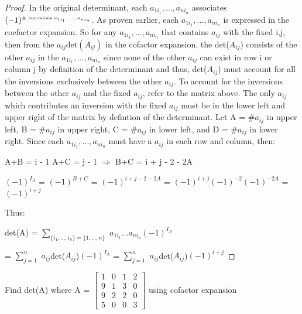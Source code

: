 \begin{proof}
        In the original determinant, each $a_{1i_1},...,a_{ni_n}$ associates
        $(-1)^{\text{\tiny \# inversions $a_{1i_1},...,a_{ni_n}$}}$.
        As proven earlier, each $a_{1i_1},...,a_{ni_n}$ is expressed
        in the coefactor expansion.
        So for any $a_{1i_1},...,a_{ni_n}$ that contains $a_{ij}$ with the
        fixed i,j, then from the $a_{ij}\text{det}(A_{ij})$ in the
        cofactor expansion, the det($A_{ij}$)
        consists of the other $a_{ij}$ in the $a_{1i_1},...,a_{ni_n}$
        since none of the other $a_{ij}$ can exist in row i or column j
        by definition of the determinant and thus, det($A_{ij}$) must account
        for all the inversions exclusively between the other $a_{ij}$.
        To account for the inversions between the other $a_{ij}$
        and the fixed $a_{ij}$, refer to the matrix above.
        The only $a_{ij}$ which contributes an inversion with the fixed $a_{ij}$
        must be in the lower left and upper right of the matrix
        by defintion of the determinant.
        Let A = \#$a_{ij}$ in upper left, B = \#$a_{ij}$ in upper right,
        C = \#$a_{ij}$ in lower left, and D = \#$a_{ij}$ in lower right.
        Since each $a_{1i_1},...,a_{ni_n}$
        must have a $a_{ij}$ in each row and column, then:

        \hspace{0.5cm}
        A+B = i - 1
        \hspace{1cm}
        A+C = j - 1
        \hspace{1cm}
        $\Rightarrow$
        \hspace{1cm}
        B+C = i + j - 2 - 2A

        \hspace{0.5cm}
        $(-1)^{I_A}$ = $(-1)^{B+C}$ = $(-1)^{i+j-2-2A}$
        = $(-1)^{i+j}(-1)^{-2}(-1)^{-2A}$
        = $(-1)^{i+j}$

        Thus:

        \hspace{0.5cm}
        det(A)
        = $\sum_{\{i_1,...,i_n\} = \{1,...,n\}}$
            $a_{1i_1}...a_{ni_n}(-1)^{I_A}$

        \hspace{1.8cm}
        = $\sum_{j=1}^n$ $a_{ij}$det($A_{ij}$)$(-1)^{I_A}$
        = $\sum_{j=1}^n$ $a_{ij}$det($A_{ij}$)$(-1)^{i+j}$
    \end{proof}

    \newpage



    \begin{example}
        Find det(A) where A =
        \scriptsize
        $\begin{bmatrix}
            1 & 0 & 1 & 2 \\
            9 & 1 & 3 & 0 \\
            9 & 2 & 2 & 0 \\
            5 & 0 & 0 & 3
        \end{bmatrix}$
        \normalsize
        using cofactor expansion
    \end{example}

